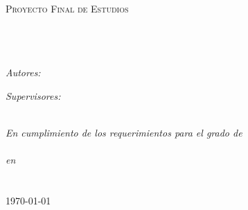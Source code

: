 \documentclass[10pt, twoside]{Thesis} %
\begin{document}
\begin{titlepage}
\begin{center}

\textsc{\LARGE \univname}\\[1.5cm] %
\textsc{\Large Proyecto Final de Estudios}\\[0.5cm] %

\HRule \\[0.4cm] %
{\huge \bfseries \ttitle}\\[0.4cm] %
\HRule \\[1.5cm] %
 
\begin{minipage}{0.4\textwidth}
\begin{flushleft} \large
\emph{Autores:}\\
{\authornames} %
\end{flushleft}
\end{minipage}
\begin{minipage}{0.4\textwidth}
\begin{flushright} \large
\emph{Supervisores:} \\
{\supname} %
\end{flushright}
\end{minipage}\\[3cm]
 
\large \textit{En cumplimiento de los requerimientos para el grado de\\\degreename}\\[0.3cm] %
\textit{en}\\[0.4cm]
\facname\\\univname\\[2cm] %
 
{\large \today}\\[4cm] %
 
\vfill
\end{center}

\end{titlepage}

\end{document}
